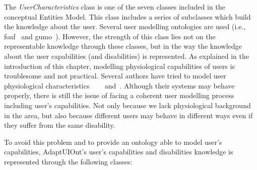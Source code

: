 The \textit{UserCharacteristics} class is one of the seven classes included in
the conceptual Entities Model. This class includes a series of subclasses which
build the knowledge about the user. Several user modelling ontologies are used
(i.e., \ac{foaf}~\citep{foaf} and \ac{gumo}~\citep{heckmann_gumogeneral_2005}). 
However, the strength of this class lies not on the representable knowledge 
through these classes, but in the way the knowledge about the user capabilities
(and disabilities) is represented. As explained in the introduction of this 
chapter, modelling physiological capabilities of users is troublesome and not 
practical. Several authors have tried to model user physiological characteristics~\citep{gregor_designing_2002}
\citep{razmerita_ontology_based_2003}~\citep{pereira_triple_2005}~\citep{persad_characterising_2007}
\citep{persad_cognitive_2007} and~\citep{skillen2012ontological}. Although their
systems may behave properly, there is still the issue of facing a coherent user
modelling process including user's capabilities. Not only because we lack
physiological background in the area, but also because different users may behave
in different ways even if they suffer from the same disability. 

To avoid this problem and to provide an ontology able to model user's 
capabilities, AdaptUIOnt's user's capabilities and disabilities knowledge is 
represented through the following classes:

